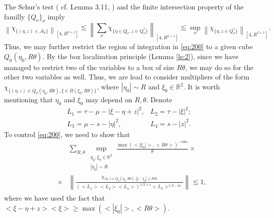 \documentclass[draft,11pt,leqno]{amsart}
\newcommand{\norm}[2]{{\left\| #1 \right\|}_{#2}}
\newcommand{\ve}{\varepsilon}
\newcommand{\rtwo}{\mathbb R^2}
\newcommand{\ca}{\mathcal A}
\newcommand{\suml}{\sum\limits}
\newcommand{\supl}{\sup\limits}
\newcommand{\f}{\displaystyle\frac}
\begin{document}
The Schur's test ( cf. Lemma 3.11, \cite{Tao} ) and the finite
intersection property of the familly $\{Q_\nu\}_\nu$ imply
$$
\norm{\chi_{\{(\eta,z)\in \ca_0\}}}{[4,R^{2+1}]}\lesssim
\norm{\suml_{\nu} \chi_{\{\eta\in Q_\nu, z\in Q_\nu^*\}}}{[4,R^{2+1}]}
\lesssim \supl_{\nu}\norm{\chi_{\{\eta,z \in Q_\nu^*\}}}{[4,R^{2+1}]}.
$$
Thus, we may further restrict the region of integration in \eqref{eq:200} to a given cube
$Q_0(\eta_0,R\theta)$. By the box localization principle (Lemma \ref{le:2}),
since we have managed to restrict two of the variables to a box of size $R\theta$, we may do so for
the other two variables as well. Thus, we are lead to 
consider multipliers of the form
$\displaystyle\chi_{\{(\eta,z)\in Q_0(\eta_0,R\theta), \xi\in B(\xi_0,R\theta)\}}$, where $|\eta_0|\sim R$ and
$\xi_0\in \rtwo$. It is worth mentioning that $\eta_0$ and $\xi_0$ may depend on $R, \theta$.
Denote
\begin{eqnarray*}
L_1=\tau-\mu-|\xi-\eta+z|^2, &  L_2=\tau-|\xi|^2 ;\\
L_3=\mu-s-|\eta|^2, & L_4=s-|z|^2.
\end{eqnarray*}
To control \eqref{eq:200}, we need to show that
\begin{eqnarray}
\label{eq:300}
& &\suml_{R,\theta}
\supl_{\begin{array}{l}\eta_0,\xi_0\in \rtwo \\|\eta_0|\sim R
\end{array}} \f{\max(<|\xi_0|>,<R\theta>)^{-100\ve}}{\theta}\times\\
&\times& \norm{\f{\chi_{\{\eta,z\in Q_0(\eta_0,R\theta),|\xi-\xi_0|\leq R\theta\} }}
{(<L_1><L_2><L_4>)^{1/2+\ve}
<L_3>^{1/2-2\ve}}}{}\lesssim 1,
\nonumber
\end{eqnarray}
where we have used the fact that $<\xi-\eta+z><\xi>\geq 
\max(<|\xi_0|>,<R\theta>)$.
\end{document}
